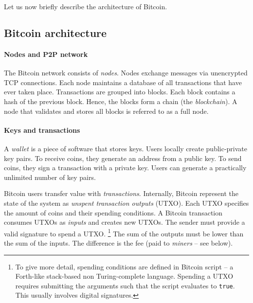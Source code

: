 
Let us now briefly describe the architecture of Bitcoin.

\subsection{Bitcoin architecture}

\paragraph{Nodes and P2P network}

The Bitcoin network consists of \textit{nodes}.
Nodes exchange messages via unencrypted TCP connections.
Each node maintains a database of all transactions that have ever taken place.
Transactions are grouped into blocks.
Each block contains a hash of the previous block.
Hence, the blocks form a chain (the \textit{blockchain}).
A node that validates and stores all blocks is referred to as a full node.



\paragraph{Keys and transactions}

A \textit{wallet} is a piece of software that stores keys.
Users locally create public-private key pairs.
To receive coins, they generate an address from a public key.
To send coins, they sign a transaction with a private key.
Users can generate a practically unlimited number of key pairs.

Bitcoin users transfer value with \textit{transactions}.
Internally, Bitcoin represent the state of the system as \textit{unspent transaction outputs} (UTXO).
Each UTXO specifies the amount of coins and their spending conditions.
A Bitcoin transaction consumes UTXOs as \textit{inputs} and creates new UTXOs.
The sender must provide a valid signature to spend a UTXO.
\footnote{To give more detail, spending conditions are defined in Bitcoin script -- a Forth-like stack-based non Turing-complete language.
Spending a UTXO requires submitting the arguments such that the script evaluates to \texttt{true}.
This usually involves digital signatures.}
The sum of the outputs must be lower than the sum of the inputs.
The difference is the fee (paid to \textit{miners} -- see below).


